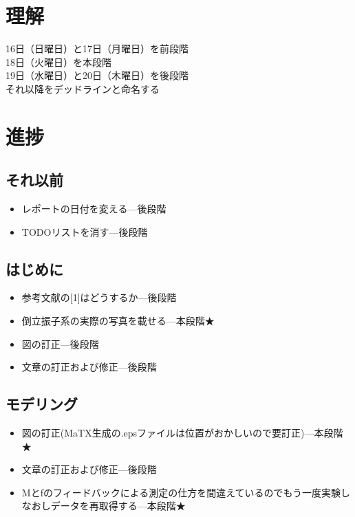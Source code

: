 \section{理解}
16日（日曜日）と17日（月曜日）を前段階\\
18日（火曜日）を本段階\\
19日（水曜日）と20日（木曜日）を後段階\\
それ以降をデッドラインと命名する

\section{進捗}
	\subsection{それ以前}
		\begin{itemize}
		  \item レポートの日付を変える---後段階
		  \item TODOリストを消す---後段階
		\end{itemize}
	\subsection{はじめに}
		\begin{itemize}
		  \item 参考文献の[1]はどうするか---後段階
		  \item 倒立振子系の実際の写真を載せる---本段階★
		  \item 図の訂正---後段階
		  \item 文章の訂正および修正---後段階
		\end{itemize}
	\subsection{モデリング}
		\begin{itemize}
		  \item 図の訂正(MaTX生成の.epsファイルは位置がおかしいので要訂正)---本段階★
		  \item 文章の訂正および修正---後段階
		  \item Mとfのフィードバックによる測定の仕方を間違えているのでもう一度実験しなおしデータを再取得する---本段階★
		\end{itemize}
